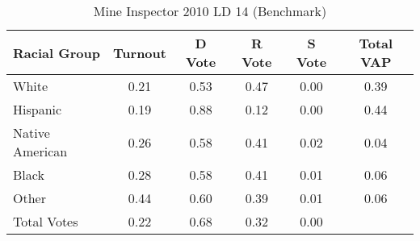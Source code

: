 \begin{table}[htb]
\begin{center}
\caption{Mine Inspector 2010 LD 14 (Benchmark)}
\label{smine_vap_ld_14_benchmark}
\begin{tabular}{lccccc}
  \hline
Racial Group & Turnout & D Vote & R Vote & S Vote & Total VAP \\ 
  \hline
White & 0.21 & 0.53 & 0.47 & 0.00 & 0.39 \\ 
  Hispanic & 0.19 & 0.88 & 0.12 & 0.00 & 0.44 \\ 
  Native American & 0.26 & 0.58 & 0.41 & 0.02 & 0.04 \\ 
  Black & 0.28 & 0.58 & 0.41 & 0.01 & 0.06 \\ 
  Other & 0.44 & 0.60 & 0.39 & 0.01 & 0.06 \\ 
  Total Votes & 0.22 & 0.68 & 0.32 & 0.00 &  \\ 
   \hline
\end{tabular}
\end{center}
\end{table}
